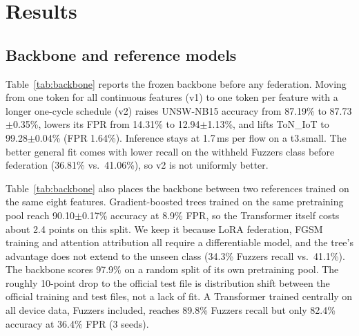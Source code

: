 \section{Results}

\subsection{Backbone and reference models}
Table~\ref{tab:backbone} reports the frozen backbone before any federation.
Moving from one token for all continuous features (v1) to one token per
feature with a longer one-cycle schedule (v2) raises UNSW-NB15 accuracy from
87.19\% to 87.73$\pm$0.35\%, lowers its FPR from 14.31\% to
12.94$\pm$1.13\%, and lifts ToN\_IoT to 99.28$\pm$0.04\% (FPR 1.64\%).
Inference stays at 1.7\,ms per flow on a t3.small. The better general fit
comes with lower recall on the withheld Fuzzers class before federation
(36.81\% vs.\ 41.06\%), so v2 is not uniformly better.

\begin{table}[t]\centering
\caption{Frozen backbone and reference models on the official UNSW-NB15 test set (82{,}332 flows) and the ToN\_IoT held-out split (31{,}656 flows); same eight features, EC2. GBM = gradient-boosted trees. Mean $\pm$ sd over 3 seeds where shown (v1 frozen: single run; federated row: 4 seeds).}
\label{tab:backbone}
\end{table}

Table~\ref{tab:backbone} also places the backbone between two references trained on
the same eight features. Gradient-boosted trees trained on the same
pretraining pool reach 90.10$\pm$0.17\% accuracy at 8.9\% FPR, so the
Transformer itself costs about 2.4 points on this split. We keep it because
LoRA federation, FGSM training and attention attribution all require a
differentiable model, and the tree's advantage does not extend to the unseen
class (34.3\% Fuzzers recall vs.\ 41.1\%). The backbone scores 97.9\% on a
random split of its own pretraining pool. The roughly 10-point drop to the
official test file is distribution shift between the official training and
test files, not a lack of fit. A Transformer trained
centrally on all device data, Fuzzers included, reaches 89.8\% Fuzzers recall
but only 82.4\% accuracy at 36.4\% FPR (3 seeds).

